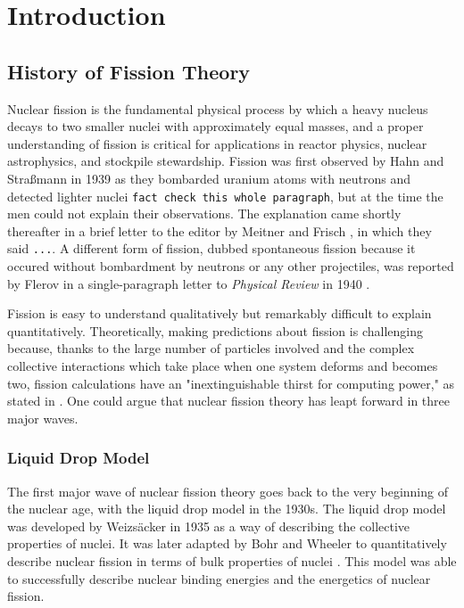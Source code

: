 \chapter{Introduction}\label{chap:Intro}

\section{History of Fission Theory}
Nuclear fission is the fundamental physical process by which a heavy nucleus decays to two smaller nuclei with approximately equal masses, and a proper understanding of fission is critical for applications in reactor physics, nuclear astrophysics, and stockpile stewardship. Fission was first observed by Hahn and Stra\ss{}mann in 1939 \cite{Hahn1939} as they bombarded uranium atoms with neutrons and detected lighter nuclei \verb|fact check this whole paragraph|, but at the time the men could not explain their observations. The explanation came shortly thereafter in a brief letter to the editor by Meitner and Frisch \cite{Meitner1939}, in which they said \verb|...|. A different form of fission, dubbed spontaneous fission because it occured without bombardment by neutrons or any other projectiles, was reported by Flerov in a single-paragraph letter to \textit{Physical Review} in 1940 \cite{Flerov1940}.


Fission is easy to understand qualitatively but remarkably difficult to explain quantitatively. Theoretically, making predictions about fission is challenging because, thanks to the large number of particles involved and the complex collective interactions which take place when one system deforms and becomes two, fission calculations have an "inextinguishable thirst for computing power," as stated in \cite{Schunck2016}. One could argue that nuclear fission theory has leapt forward in three major waves.

\subsection{Liquid Drop Model}
The first major wave of nuclear fission theory goes back to the very beginning of the nuclear age, with the liquid drop model in the 1930s. The liquid drop model was developed by Weizs\"acker in 1935 \cite{Weizsacker1935} as a way of describing the collective properties of nuclei. It was later adapted by Bohr and Wheeler to quantitatively describe nuclear fission in terms of bulk properties of nuclei \cite{Bohr1939}. This model was able to successfully describe nuclear binding energies and the energetics of nuclear fission.

